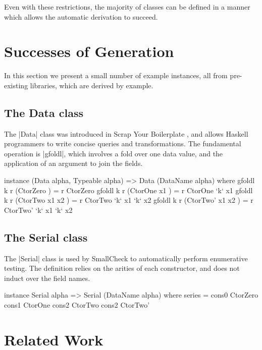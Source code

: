 \documentclass{llncs}
\begin{document}
Even with these restrictions, the majority of classes can be defined in a manner which allows the automatic derivation to succeed.

\section{Successes of Generation}
\label{sec:automatic_success}

In this section we present a small number of example instances, all from pre-existing libraries, which are derived by example.

\subsection{The Data class}

The |Data| class was introduced in Scrap Your Boilerplate \cite{lammel:syb}, and allows Haskell programmers to write concise queries and transformations. The fundamental operation is |gfoldl|, which involves a fold over one data value, and the application of an argument to join the fields.

\begin{code}
instance (Data alpha, Typeable alpha) => Data (DataName alpha) where
    gfoldl k r (CtorZero         ) = r CtorZero
    gfoldl k r (CtorOne   x1     ) = r CtorOne   `k` x1
    gfoldl k r (CtorTwo   x1 x2  ) = r CtorTwo   `k` x1 `k` x2
    gfoldl k r (CtorTwo'  x1 x2  ) = r CtorTwo'  `k` x1 `k` x2
\end{code}

\subsection{The Serial class}

The |Serial| class is used by SmallCheck \cite{runciman:smallcheck} to automatically perform enumerative testing. The definition relies on the arities of each constructor, and does not induct over the field names.

\begin{code}
instance Serial alpha => Serial (DataName alpha) where
    series = cons0 CtorZero \/ cons1 CtorOne  \/ cons2 CtorTwo  \/ cons2 CtorTwo'
\end{code}

\section{Related Work}
\label{sec:related}
\end{document}
